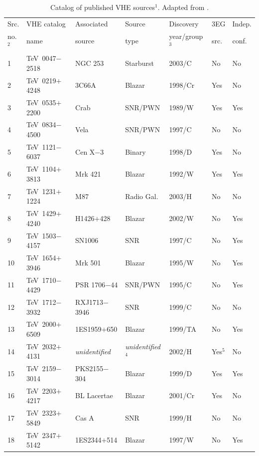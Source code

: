 \begin{table}[t] 
\caption{\label{TAB::INTRODUCTION::VHESOURCES}Catalog of published VHE 
sources$^1$. Adapted from \citet{REF::HORAN_WEEKES::2NDVERITAS2004}.}
\begin{centering}
\begin{tabular}{lllllll}\hline
Src.     & VHE catalog & Associated   & Source   & Discovery & 3EG     & Indep. \\
no.$^2$  & name      & source         & type & year/group$^3$& src.    & conf.  \\\hline
1  & TeV~0047$-$2518 & NGC 253        & Starburst  & 2003/C  & No      & No  \\
2  & TeV~0219$+$4248 & 3C66A          & Blazar     & 1998/Cr & Yes     & No  \\
3  & TeV~0535$+$2200 & Crab           & SNR/PWN    & 1989/W  & Yes     & Yes \\
4  & TeV~0834$-$4500 & Vela           & SNR/PWN    & 1997/C  & No      & No  \\
5  & TeV~1121$-$6037 & Cen X$-$3      & Binary     & 1998/D  & Yes     & No  \\
6  & TeV~1104$+$3813 & Mrk 421        & Blazar     & 1992/W  & Yes     & Yes \\
7  & TeV~1231$+$1224 & M87            & Radio Gal. & 2003/H  & No      & No  \\
8  & TeV~1429$+$4240 & H1426$+$428    & Blazar     & 2002/W  & No      & Yes \\
9  & TeV~1503$-$4157 & SN1006         & SNR        & 1997/C  & No      & Yes \\
10 & TeV~1654$+$3946 & Mrk 501        & Blazar     & 1995/W  & No      & Yes \\
11 & TeV~1710$-$4429 & PSR 1706$-$44  & SNR/PWN    & 1995/C  & No      & Yes \\
12 & TeV~1712$-$3932 & RXJ1713$-$3946 & SNR        & 1999/C  & No      & No  \\
13 & TeV~2000$+$6509 & 1ES1959$+$650  & Blazar     & 1999/TA & No      & Yes \\
14 & TeV~2032$+$4131 & \textit{unidentified} 
                       & \textit{unidentified}$^4$ & 2002/H  & Yes$^5$ & No  \\
15 & TeV~2159$-$3014 & PKS2155$-$304  & Blazar     & 1999/D  & Yes     & Yes \\
16 & TeV~2203$+$4217 & BL Lacertae    & Blazar     & 2001/Cr & Yes     & No  \\
17 & TeV~2323$+$5849 & Cas A          & SNR        & 1999/H  & No      & No  \\
18 & TeV~2347$+$5142 & 1ES2344$+$514  & Blazar     & 1997/W  & No      & Yes \\\hline
\end{tabular}


\end{centering}
\end{table}
